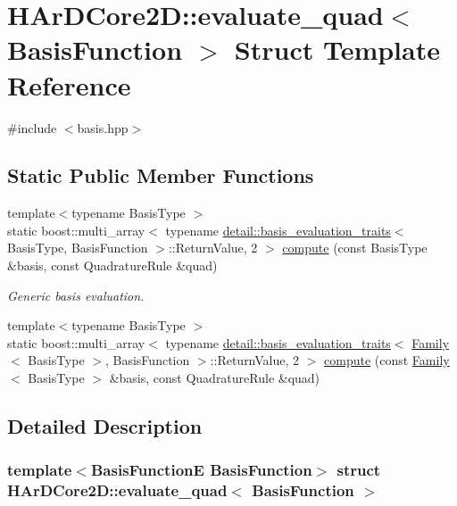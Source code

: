 \hypertarget{structHArDCore2D_1_1evaluate__quad}{}\section{H\+Ar\+D\+Core2D\+:\+:evaluate\+\_\+quad$<$ Basis\+Function $>$ Struct Template Reference}
\label{structHArDCore2D_1_1evaluate__quad}


{\ttfamily \#include $<$basis.\+hpp$>$}

\subsection*{Static Public Member Functions}
\begin{DoxyCompactItemize}
\item 
{\footnotesize template$<$typename Basis\+Type $>$ }\\static boost\+::multi\+\_\+array$<$ typename \hyperlink{structHArDCore2D_1_1detail_1_1basis__evaluation__traits}{detail\+::basis\+\_\+evaluation\+\_\+traits}$<$ Basis\+Type, Basis\+Function $>$\+::Return\+Value, 2 $>$ \hyperlink{structHArDCore2D_1_1evaluate__quad_a687c3c9504c4b10c5a18654530980086}{compute} (const Basis\+Type \&basis, const Quadrature\+Rule \&quad)
\begin{DoxyCompactList}\small\item\em Generic basis evaluation. \end{DoxyCompactList}\item 
{\footnotesize template$<$typename Basis\+Type $>$ }\\static boost\+::multi\+\_\+array$<$ typename \hyperlink{structHArDCore2D_1_1detail_1_1basis__evaluation__traits}{detail\+::basis\+\_\+evaluation\+\_\+traits}$<$ \hyperlink{classHArDCore2D_1_1Family}{Family}$<$ Basis\+Type $>$, Basis\+Function $>$\+::Return\+Value, 2 $>$ \hyperlink{structHArDCore2D_1_1evaluate__quad_a06cedf0c3440b94b9974922c72ea7c11}{compute} (const \hyperlink{classHArDCore2D_1_1Family}{Family}$<$ Basis\+Type $>$ \&basis, const Quadrature\+Rule \&quad)
\end{DoxyCompactItemize}


\subsection{Detailed Description}
\subsubsection*{template$<$Basis\+FunctionE Basis\+Function$>$\newline
struct H\+Ar\+D\+Core2\+D\+::evaluate\+\_\+quad$<$ Basis\+Function $>$}

